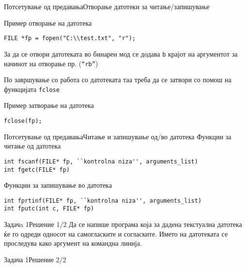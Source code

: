 \begin{frame}[fragile]{Потсетување од предавања}{Отворање датотеки за
читање/запишување}

\begin{exampleblock}{Пример отворање на датотека}
\begin{lstlisting}
FILE *fp = fopen("C:\\test.txt", "r");
\end{lstlisting}
\begin{scriptsize}
За да се отвори датотеката во бинарен мод се додава \texttt{b} крајот на
аргументот за начинот на отворање пр. (\texttt{``rb''})
\end{scriptsize}
\end{exampleblock}
По завршување со работа со датотеката таа треба да се затвори со помош на
функцијата \texttt{fclose}
\begin{exampleblock}{Пример затворање на датотека}
\begin{lstlisting}
fclose(fp);
\end{lstlisting}
\end{exampleblock}
\end{frame}

\begin{frame}[fragile]{Потсетување од предавања}{Читање и запишување од/во
датотека}
Функции за читање од датотека
\begin{lstlisting}
int fscanf(FILE* fp, ``kontrolna niza'', arguments_list)
int fgetc(FILE* fp)
\end{lstlisting}

Функции за запишување во датотека
\begin{lstlisting}
int fprtinf(FILE* fp, ``kontrolna niza'', arguments_list)
int fputc(int c, FILE* fp)
\end{lstlisting}

\end{frame}


\begin{frame}[fragile]{Задачa 1}{Решение 1/2}
Да се напише програма која за дадена текстуална датотека ќе го одреди односот на
самогласките и согласките. Името на датотеката се проследува како аргумент на
командна линија.

\end{frame}

\begin{frame}[fragile]{Задача 1}{Решение 2/2}

\end{frame}

